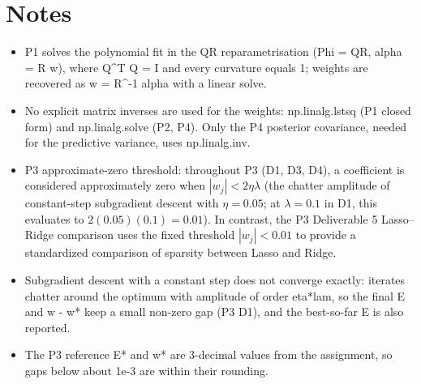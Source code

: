 \documentclass[10pt,a4paper]{article}
\begin{document}
\section*{Notes}
\begin{itemize}
  \item P1 solves the polynomial fit in the QR reparametrisation (Phi = QR, alpha = R w), where Q\textasciicircum T Q = I and every curvature equals 1; weights are recovered as w = R\textasciicircum -1 alpha with a linear solve.
  \item No explicit matrix inverses are used for the weights: np.linalg.lstsq (P1 closed form) and np.linalg.solve (P2, P4). Only the P4 posterior covariance, needed for the predictive variance, uses np.linalg.inv.
  \item P3 approximate-zero threshold: throughout P3 (D1, D3, D4), a coefficient is considered approximately zero when $|w_j| < 2\eta\lambda$ (the chatter amplitude of constant-step subgradient descent with $\eta = 0.05$; at $\lambda = 0.1$ in D1, this evaluates to $2(0.05)(0.1) = 0.01$). In contrast, the P3 Deliverable 5 Lasso--Ridge comparison uses the fixed threshold $|w_j| < 0.01$ to provide a standardized comparison of sparsity between Lasso and Ridge.
  \item Subgradient descent with a constant step does not converge exactly: iterates chatter around the optimum with amplitude of order eta*lam, so the final E and \textbar{}\textbar{}w - w*\textbar{}\textbar{} keep a small non-zero gap (P3 D1), and the best-so-far E is also reported.
  \item The P3 reference E* and w* are 3-decimal values from the assignment, so gaps below about 1e-3 are within their rounding.
\end{itemize}
\end{document}
